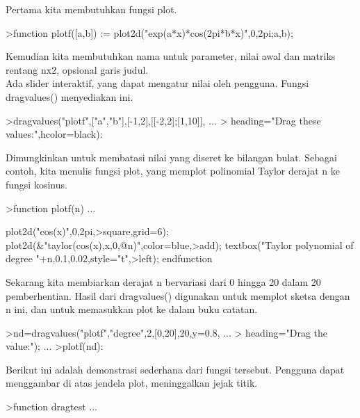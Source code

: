 \documentclass[a4paper,10pt]{article}
\begin{document}
\begin{eulernotebook}
\begin{eulercomment}
\begin{eulercomment}
\begin{eulercomment}
\begin{eulercomment}
\begin{eulercomment}
\begin{eulercomment}
\begin{eulercomment}
\begin{eulercomment}
\begin{eulercomment}
\begin{eulercomment}
\begin{eulercomment}
\begin{eulercomment}
\begin{eulercomment}
\begin{eulercomment}
\begin{eulercomment}
Pertama kita membutuhkan fungsi plot.
\end{eulercomment}
\begin{eulerprompt}
>function plotf([a,b]) := plot2d("exp(a*x)*cos(2pi*b*x)",0,2pi;a,b);
\end{eulerprompt}
\begin{eulercomment}
Kemudian kita membutuhkan nama untuk parameter, nilai awal dan matriks
rentang nx2, opsional garis judul.\\
Ada slider interaktif, yang dapat mengatur nilai oleh pengguna. Fungsi
dragvalues() menyediakan ini.
\end{eulercomment}
\begin{eulerprompt}
>dragvalues("plotf",["a","b"],[-1,2],[[-2,2];[1,10]], ...
>  heading="Drag these values:",hcolor=black):
\end{eulerprompt}
\begin{eulercomment}
Dimungkinkan untuk membatasi nilai yang diseret ke bilangan bulat.
Sebagai contoh, kita menulis fungsi plot, yang memplot polinomial
Taylor derajat n ke fungsi kosinus.
\end{eulercomment}
\begin{eulerprompt}
>function plotf(n) ...
\end{eulerprompt}
\begin{eulerudf}
  plot2d("cos(x)",0,2pi,>square,grid=6);
  plot2d(&"taylor(cos(x),x,0,@n)",color=blue,>add);
  textbox("Taylor polynomial of degree "+n,0.1,0.02,style="t",>left);
  endfunction
\end{eulerudf}
\begin{eulercomment}
Sekarang kita membiarkan derajat n bervariasi dari 0 hingga 20 dalam
20 pemberhentian. Hasil dari dragvalues() digunakan untuk memplot
sketsa dengan n ini, dan untuk memasukkan plot ke dalam buku catatan.
\end{eulercomment}
\begin{eulerprompt}
>nd=dragvalues("plotf","degree",2,[0,20],20,y=0.8, ...
>   heading="Drag the value:"); ...
>plotf(nd):
\end{eulerprompt}
\begin{eulercomment}
Berikut ini adalah demonstrasi sederhana dari fungsi tersebut.
Pengguna dapat menggambar di atas jendela plot, meninggalkan jejak
titik.
\end{eulercomment}
\begin{eulerprompt}
>function dragtest ...
\end{eulerprompt}

\end{eulercomment}
\end{eulercomment}
\end{eulercomment}
\end{eulercomment}
\end{eulercomment}
\end{eulercomment}
\end{eulercomment}
\end{eulercomment}
\end{eulercomment}
\end{eulercomment}
\end{eulercomment}
\end{eulercomment}
\end{eulercomment}
\end{eulercomment}
\end{eulernotebook}
\end{document}
